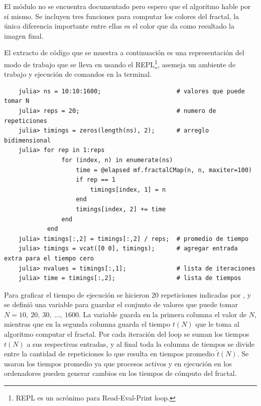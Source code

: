 El módulo no se encuentra documentado pero espero que el algoritmo hable por sí mismo. Se incluyen tres funciones para computar los colores del fractal, la única diferencia importante entre ellas es el color que da como resultado la imagen final.

El extracto de código que se muestra a continuación es una representación del modo de trabajo que se lleva en  usando el REPL\footnote{REPL es un acrónimo para Read-Eval-Print loop.}, asemeja un ambiente de trabajo y ejecución de comandos en la terminal.
\begin{listing}[ht!]
    \begin{verbatim}
    julia> ns = 10:10:1600;                     # valores que puede tomar N
    julia> reps = 20;                           # numero de repeticiones
    julia> timings = zeros(length(ns), 2);      # arreglo bidimensional
    julia> for rep in 1:reps
                for (index, n) in enumerate(ns)
                    time = @elapsed mf.fractalCMap(n, n, maxiter=100)
                    if rep == 1
                        timings[index, 1] = n
                    end
                    timings[index, 2] += time
                end
            end
    julia> timings[:,2] = timings[:,2] / reps;  # promedio de tiempo
    julia> timings = vcat([0 0], timings);      # agregar entrada extra para el tiempo cero
    julia> nvalues = timings[:,1];              # lista de iteraciones
    julia> time = timings[:,2];                 # lista de tiempos
    \end{verbatim}
\end{listing}

Para graficar el tiempo de ejecución se hicieron 20 repeticiones indicadas por , y se definió una variable  para guardar el conjunto de valores que puede tomar $N = 10,\ 20,\ 30,\ \ldots,\ 1600$. La variable  guarda en la primera columna el valor de $N$, mientras que en la segunda columna guarda el tiempo $t(N)$ que le toma al algoritmo computar el fractal. Por cada iteración del loop se suman los tiempos $t(N)$ a sus respectivas entradas, y al final toda la columna de tiempos se divide entre la cantidad de repeticiones  lo que resulta en tiempos promedio $\tilde{t}(N)$. Se usaron los tiempos promedio ya que procesos activos y en ejecución en los ordenadores pueden generar cambios en los tiempos de cómputo del fractal.

